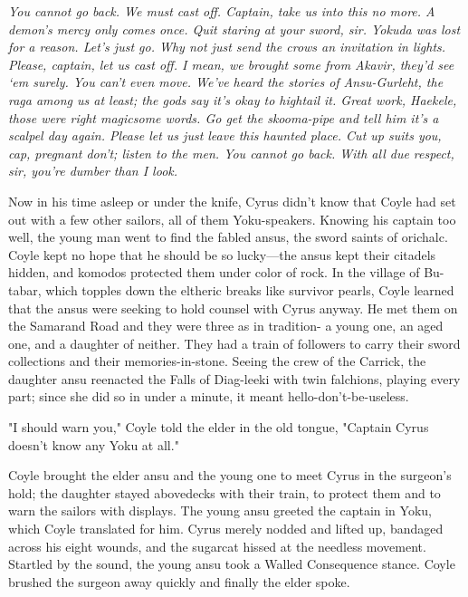 \parabreak

\textit{You cannot go back. We must cast off. Captain, take us into this no more. A demon’s mercy only comes once. Quit staring at your sword, sir. Yokuda was lost for a reason. Let’s just go. Why not just send the crows an invitation in lights. Please, captain, let us cast off. I mean, we brought some from Akavir, they’d see ‘em surely. You can’t even move. We’ve heard the stories of Ansu-Gurleht, the raga among us at least; the gods say it’s okay to hightail it. Great work, Haekele, those were right magicsome words. Go get the skooma-pipe and tell him it’s a scalpel day again. Please let us just leave this haunted place. Cut up suits you, cap, pregnant don’t; listen to the men. You cannot go back. With all due respect, sir, you’re dumber than I look.}

\parabreak

Now in his time asleep or under the knife, Cyrus didn’t know that Coyle had set out with a few other sailors, all of them Yoku-speakers. Knowing his captain too well, the young man went to find the fabled ansus, the sword saints of orichalc. Coyle kept no hope that he should be so lucky—the ansus kept their citadels hidden, and komodos protected them under color of rock. In the village of Bu-tabar, which topples down the eltheric breaks like survivor pearls, Coyle learned that the ansus were seeking to hold counsel with Cyrus anyway. He met them on the Samarand Road and they were three as in tradition- a young one, an aged one, and a daughter of neither. They had a train of followers to carry their sword collections and their memories-in-stone. Seeing the crew of the Carrick, the daughter ansu reenacted the Falls of Diag-leeki with twin falchions, playing every part; since she did so in under a minute, it meant hello-don’t-be-useless.

"I should warn you," Coyle told the elder in the old tongue, "Captain Cyrus doesn’t know any Yoku at all."

\parabreak

Coyle brought the elder ansu and the young one to meet Cyrus in the surgeon’s hold; the daughter stayed abovedecks with their train, to protect them and to warn the sailors with displays. The young ansu greeted the captain in Yoku, which Coyle translated for him. Cyrus merely nodded and lifted up, bandaged across his eight wounds, and the sugarcat hissed at the needless movement. Startled by the sound, the young ansu took a Walled Consequence stance. Coyle brushed the surgeon away quickly and finally the elder spoke.

